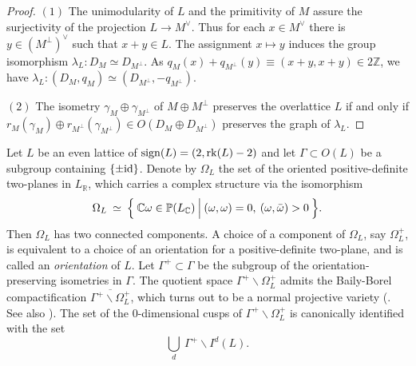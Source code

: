 \documentclass{article}
\theoremstyle{plain}
\theoremstyle{definition}
\theoremstyle{remark}
\newcommand{\Z}{{\mathbb Z}}
\newcommand{\C}{{\mathbb C}}
\newcommand{\R}{{\mathbb R}}
\newcommand{\proj}{{\mathbb P}}
\begin{document}
\begin{proof}
$(1)$  
The unimodularity of $L$ and 
the primitivity of $M$  
assure the surjectivity of the projection 
$L \to M^{\vee}$. 
Thus 
for each $x \in M^{\vee} $ 
there is $y \in (M^{\perp})^{\vee}$ 
such that 
$x + y \in L$. 
The assignment $x \mapsto y$ 
induces the group isomorphism 
$\lambda _{L} : D_{M} \simeq D_{M^{\perp}}$. 
As  
$q_{M}(x) + q_{M^{\perp}}(y) \equiv (x+y, x+y) \in 2{\Z}$, 
we have 
$\lambda _{L} : (D_{M}, q_{M}) \simeq (D_{M^{\perp}}, -q_{M^{\perp}})$. 



$(2)$ 
The isometry 
$\gamma _{M} \oplus \gamma _{M^{\perp}}$ 
of 
$M \oplus M^{\perp}$ 
preserves the overlattice $L$ 
if and only if 
$r_{M}(\gamma _{M}) \oplus r_{M^{\perp}}(\gamma _{M^{\perp}}) 
\in 
O(D_{M} \oplus D_{M^{\perp}})$ 
preserves the graph of 
$\lambda _{L}$. 
\end{proof}  







Let $L$ be an even lattice of 
${\rm sign\/}(L) = (2, {\rm rk\/}(L)-2)$ 
and let 
$\Gamma \subset O(L)$ be a subgroup containing 
$\{ \pm {\rm id\/} \}$. 
Denote by  
$\Omega _{L}$ 
the set of the oriented positive-definite two-planes in $L_{{\R}}$,  
which carries a complex structure 
via the isomorphism 
\begin{equation*}\label{period domain and Grassmannian}
\Omega _{L} \: \simeq \: 
   \Bigl\{ 
           \Bigl. \: {\C}\omega \in {\proj}(L_{{\C}}) \: \Bigr| \: 
           (\omega , \omega )=0,  \: 
           (\omega , \bar{\omega})>0 \: 
   \Bigr\} . 
\end{equation*}
Then $\Omega _{L}$ has two connected components. 
A choice of a component of $\Omega _{L}$, 
say $\Omega _{L}^{+}$, 
is equivalent to 
a choice of an orientation for a positive-definite two-plane, 
and is called an {\it orientation\/} of $L$. 
Let 
$\Gamma ^{+} \subset \Gamma $ 
be the subgroup of 
the orientation-preserving isometries in $\Gamma $. 
The quotient space 
$\Gamma ^{+} \backslash \Omega _{L}^{+}$ 
admits the Baily-Borel compactification 
$\overline{\Gamma ^{+} \backslash \Omega _{L}^{+}}$, 
which turns out to be a normal projective variety (\cite{B-B}. See also \cite{Sc}). 
The set of 
the $0$-dimensional cusps of 
$\Gamma ^{+} \backslash \Omega _{L}^{+}$ 
is canonically identified with the set 
\begin{equation*}
\mathop{\bigcup}_{d} \: \Gamma ^{+} \backslash I^{d}(L). 
\end{equation*} 
\end{document}
